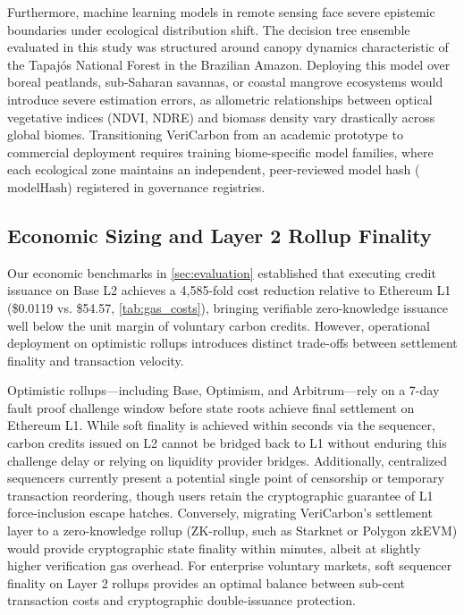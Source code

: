 \documentclass[preprint,12pt]{elsarticle}
\begin{document}
Furthermore, machine learning models in remote sensing face severe epistemic boundaries under ecological distribution shift. The decision tree ensemble evaluated in this study was structured around canopy dynamics characteristic of the Tapajós National Forest in the Brazilian Amazon. Deploying this model over boreal peatlands, sub-Saharan savannas, or coastal mangrove ecosystems would introduce severe estimation errors, as allometric relationships between optical vegetative indices (NDVI, NDRE) and biomass density vary drastically across global biomes. Transitioning VeriCarbon from an academic prototype to commercial deployment requires training biome-specific model families, where each ecological zone maintains an independent, peer-reviewed model hash ($\text{modelHash}$) registered in governance registries.

\subsection{Economic Sizing and Layer 2 Rollup Finality}

Our economic benchmarks in \autoref{sec:evaluation} established that executing credit issuance on Base L2 achieves a 4,585-fold cost reduction relative to Ethereum L1 (\$0.0119 vs. \$54.57, \autoref{tab:gas_costs}), bringing verifiable zero-knowledge issuance well below the unit margin of voluntary carbon credits. However, operational deployment on optimistic rollups introduces distinct trade-offs between settlement finality and transaction velocity.

Optimistic rollups—including Base, Optimism, and Arbitrum—rely on a 7-day fault proof challenge window before state roots achieve final settlement on Ethereum L1. While soft finality is achieved within seconds via the sequencer, carbon credits issued on L2 cannot be bridged back to L1 without enduring this challenge delay or relying on liquidity provider bridges. Additionally, centralized sequencers currently present a potential single point of censorship or temporary transaction reordering, though users retain the cryptographic guarantee of L1 force-inclusion escape hatches. Conversely, migrating VeriCarbon's settlement layer to a zero-knowledge rollup (ZK-rollup, such as Starknet or Polygon zkEVM) would provide cryptographic state finality within minutes, albeit at slightly higher verification gas overhead. For enterprise voluntary markets, soft sequencer finality on Layer 2 rollups provides an optimal balance between sub-cent transaction costs and cryptographic double-issuance protection.
\end{document}
